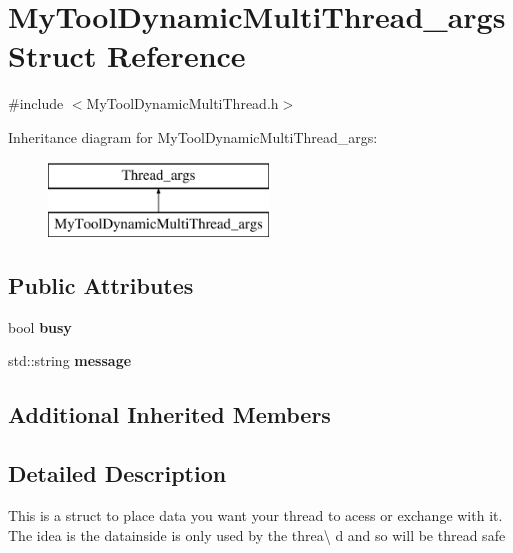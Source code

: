\hypertarget{structMyToolDynamicMultiThread__args}{\section{My\-Tool\-Dynamic\-Multi\-Thread\-\_\-args Struct Reference}
\label{structMyToolDynamicMultiThread__args}
}


{\ttfamily \#include $<$My\-Tool\-Dynamic\-Multi\-Thread.\-h$>$}

Inheritance diagram for My\-Tool\-Dynamic\-Multi\-Thread\-\_\-args\-:\begin{figure}[H]
\begin{center}
\leavevmode
\includegraphics[height=2.000000cm]{structMyToolDynamicMultiThread__args}
\end{center}
\end{figure}
\subsection*{Public Attributes}
\begin{DoxyCompactItemize}
\item 
\hypertarget{structMyToolDynamicMultiThread__args_a2d4b96b18b6e91a4244473e9e28c881b}{bool {\bfseries busy}}\label{structMyToolDynamicMultiThread__args_a2d4b96b18b6e91a4244473e9e28c881b}

\item 
\hypertarget{structMyToolDynamicMultiThread__args_a4fe59813f550a1c10a2ab6527c580a23}{std\-::string {\bfseries message}}\label{structMyToolDynamicMultiThread__args_a4fe59813f550a1c10a2ab6527c580a23}

\end{DoxyCompactItemize}
\subsection*{Additional Inherited Members}


\subsection{Detailed Description}
This is a struct to place data you want your thread to acess or exchange with it. The idea is the datainside is only used by the threa\textbackslash{} d and so will be thread safe

